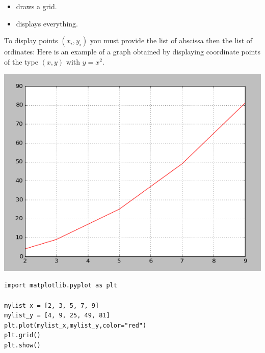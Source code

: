 \documentclass[11pt,class=report,crop=false]{standalone}
\begin{document}
\begin{cours}
\begin{itemize}
  \item {} draws a grid.
  
  \item {} displays everything.  
  
\end{itemize}

\bigskip

To display points $(x_i,y_i)$ you must provide the list of abscissa then the list of ordinates:
Here is an example of a graph obtained by displaying coordinate points of the type $(x,y)$ with $y = x^2$.

\begin{center}
\includegraphics[scale=\myscale,scale=0.45]{screen-lists-lesson-visualization-bis}
\end{center}


\begin{lstlisting}
import matplotlib.pyplot as plt

mylist_x = [2, 3, 5, 7, 9]
mylist_y = [4, 9, 25, 49, 81]
plt.plot(mylist_x,mylist_y,color="red")
plt.grid()
plt.show()
\end{lstlisting}

\end{cours}


\end{document}
